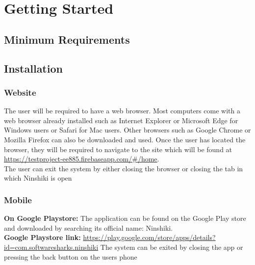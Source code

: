 \documentclass[a4paper, 12pt]{article}
\begin{document}
\section{Getting Started}

\subsection{Minimum Requirements}

\subsection{Installation}
\subsubsection{Website}
The user will be required to have a web browser. Most computers come with a web browser already installed such as Internet Explorer or Microsoft Edge for Windows users or Safari for Mac users. Other browsers such as Google Chrome or Mozilla Firefox can also be downloaded and used. Once the user has located the browser, they will be required to navigate to the site which will be found at \\ \url{https://testproject-ee885.firebaseapp.com/#/home}.\\
The user can exit the system by either closing the browser or closing the tab in which Ninshiki is open\linebreak

\subsubsection{Mobile}
\textbf{On Google Playstore:} The application can be found on the Google Play store and downloaded by searching its official name: Ninshiki.\\
\textbf{Google Playstore link:} \url{https://play.google.com/store/apps/details?id=com.softwaresharks.ninshiki}
\newline
\newline
The system can be exited by closing the app or pressing the back button on the users phone
\pagebreak
\end{document}
